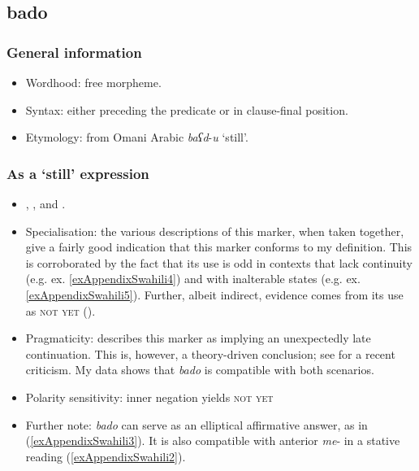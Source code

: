 \subsection{bado}
\subsubsection{General information}
\begin{itemize}
	\item Wordhood: free morpheme.
	\item Syntax: either preceding the predicate or in clause-final position.
	\item Etymology: from Omani Arabic \textit{baʕd}-\textit{u} \lq still'.
\end{itemize}


\subsubsection{As a  \lq still\rq{ }expression}
\begin{itemize}
	\item \textcite[270–271]{Ashton1947}, \textcite[44–45, 104]{Mpiranya2015} \textcite[85]{Sacleux19391941}, \textcite{Schadeberg1990} and \textcite{TUKI2014}.
	\item Specialisation: the various descriptions of this marker, when taken together, give a fairly good indication that this marker conforms to my definition. This is corroborated by the fact that its use is odd in contexts that lack continuity (e.g. ex. \ref{exAppendixSwahili4}) and with inalterable states (e.g. ex. \ref{exAppendixSwahili5}). Further, albeit indirect, evidence comes from its use as \textsc{not yet} ().
	\item Pragmaticity: \textcite{Schadeberg1990} describes this marker as implying an unexpectedly late continuation. This is, however, a theory-driven conclusion; see \textcite{vanderAuwera2021} for a recent criticism. My data shows that \textit{bado} is compatible with both scenarios.
	\item Polarity sensitivity: inner negation yields \textsc{not yet}
	\item Further note: \textit{bado} can serve as an elliptical affirmative answer, as in (\ref{exAppendixSwahili3}). It is also compatible with anterior \mbox{\textit{me}-} in a stative reading (\ref{exAppendixSwahili2}).
\end{itemize}
